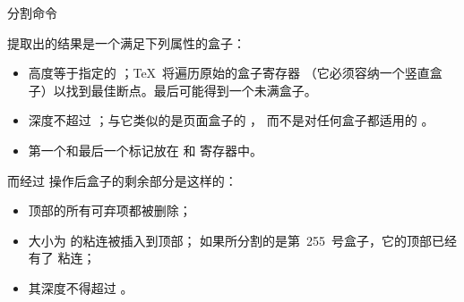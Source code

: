 \documentclass{book}
\begin{document}
分割命令
\begin{disp}
\end{disp}
提取出的结果是一个满足下列属性的盒子：
\begin{itemize}
\item 高度等于指定的 ；\TeX\ 将遍历原始的盒子寄存器%
      （它必须容纳一个竖直盒子）以找到最佳断点。最后可能得到一个未满盒子。
\item 深度不超过 ；与它类似的是页面盒子的 ，
      而不是对任何盒子都适用的 。
\item 第一个和最后一个标记放在  和 寄存器中。
\end{itemize}

而经过  操作后盒子的剩余部分是这样的：
\begin{itemize}
\item 顶部的所有可弃项都被删除；
\item 大小为  的粘连被插入到顶部；
      如果所分割的是第~255~号盒子，它的顶部已经有了  粘连；
\item 其深度不得超过 。
\end{itemize}
\end{document}
